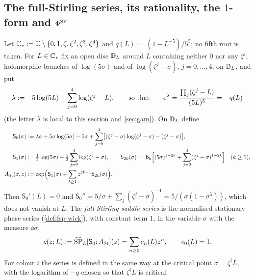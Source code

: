 
\subsection{The full-Stirling series, its rationality, the \texorpdfstring{$1$}{1}-form and \texorpdfstring{$\Phi^{\mathrm{SP}}$}{the full-Stirling WKB function}}
\label{sec:con-form}

\begin{defn}
\label{def:gam-c}
Let $\mathbb{C}_{\ast}:=\mathbb{C}\setminus\{0,1,\zeta,\zeta^2,\zeta^3,\zeta^4\}$ and $q(L):=(1-L^{-5})/5^5$; no fifth root is taken. For $L\in\mathbb{C}_{\ast}$ fix an open disc $\mathbb{D}_L$ around $L$ containing neither $0$ nor any $\zeta^j$, holomorphic branches of $\log(5\sigma)$ and of $\log(\zeta^j-\sigma)$, $j=0,\dots,4$, on $\mathbb{D}_L$, and put
\[
\lambda:=-5\log(5L)+\sum_{j=0}^4\log(\zeta^j-L),\qquad\text{so that}\qquad \mathrm{e}^{\lambda}=\frac{\prod_j(\zeta^j-L)}{(5L)^5}=-q(L)
\]
(the letter $\lambda$ is local to this section and \cref{sec:gam}). On $\mathbb{D}_L$ define
\begin{align*}
\mathsf S_0(\sigma)&:=\lambda\sigma+5\sigma\log(5\sigma)-5\sigma+\sum_{j=0}^4\bigl[(\zeta^j-\sigma)\log(\zeta^j-\sigma)-(\zeta^j-\sigma)\bigr],\\
\mathsf S_1(\sigma)&:=\tfrac12\log(5\sigma)-\tfrac12\sum_{j=0}^4\log(\zeta^j-\sigma),\qquad
\mathsf S_{2k}(\sigma):=\mathsf{b}_k\Bigl[(5\sigma)^{1-2k}+\sum_{j=0}^4(\zeta^j-\sigma)^{1-2k}\Bigr]\quad(k\geq1),\\
A_{\mathrm{St}}(\sigma,z)&:=\exp\Bigl(\mathsf S_1(\sigma)+\sum_{k\geq1}z^{2k-1}\mathsf S_{2k}(\sigma)\Bigr).
\end{align*}
Then $\mathsf S_0'(L)=0$ and $\mathsf S_0''=5/\sigma+\sum_j(\zeta^j-\sigma)^{-1}=5/(\sigma(1-\sigma^5))$, which does not vanish at $L$. The \emph{full-Stirling saddle series} is the normalised stationary-phase series (\cref{def:fsp-wick}), with constant term $1$, in the variable $\sigma$ with the measure $\dd\sigma$:
\[
c(z;L):=\widehat{\mathrm{SP}}_L[\mathsf S_0;A_{\mathrm{St}}](z)=\sum_{n\geq0}c_n(L)z^n,\qquad c_0(L)=1 .
\]
For colour $i$ the series is defined in the same way at the critical point $\sigma=\zeta^iL$, with the logarithm of $-q$ chosen so that $\zeta^iL$ is critical.
\end{defn}

